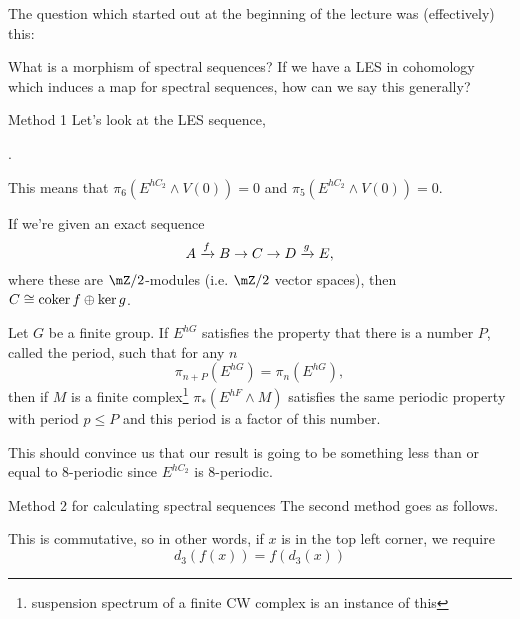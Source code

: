 The question which started out at the beginning of the lecture was (effectively) this: 
\begin{question}{}{}
    What is a morphism of spectral sequences? If we have a LES in cohomology which induces a map for spectral sequences, how can we say this generally?
\end{question}

\begin{remark}{Method 1}
    Let's look at the LES sequence, 
    \begin{center}
      .
    \end{center}
    This means that $\pi_6(E^{hC_2}\wedge V(0)) = 0$ and $\pi_5(E^{hC_2}\wedge V(0))=0.$
\end{remark}

\begin{fact}{}{}
    If we're given an exact sequence $$A\xrightarrow{f}B\to C\to D\xrightarrow{g}E,$$ where these are $\mZ/2$-modules (i.e. $\mZ/2$ vector spaces), then $C\cong \operatorname{\text{coker}} f\oplus \ker g$. 
\end{fact}

\begin{theorem}{}{}
    Let $G$ be a finite group. If $E^{hG}$ satisfies the property that there is a number $P$, called the period, such that for any $n$ $$\pi_{n+P}(E^{hG}) = \pi_{n}(E^{hG}),$$ then if $M$ is a finite complex\footnote{suspension spectrum of a finite CW complex is an instance of this} $\pi_\ast(E^{hF}\wedge M)$ satisfies the same periodic property with period $p\leq P$ and this period is a factor of this number. 
\end{theorem}
This should convince us that our result is going to be something less than or equal to 8-periodic since $E^{hC_2}$ is 8-periodic. 
 

\begin{remark}{Method 2 for calculating spectral sequences}{}
    The second method goes as follows. 
    \begin{center}
    \end{center}
    This is commutative, so in other words, if $x$ is in the top left corner, we require $$d_3(f(x)) = f(d_3(x))$$
\end{remark}